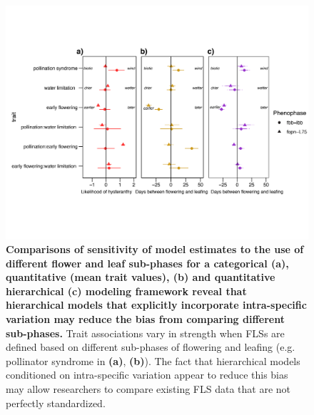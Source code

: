 \documentclass[11pt]{article}
\begin{document}
  \begin{figure}[H]
  \centering
  \includegraphics[width=\textwidth]{..//..//HFmodelplots4SUPP-01.png} 
  \caption{\textbf{Comparisons of sensitivity of model estimates to the use of different flower and leaf sub-phases for a categorical  \textbf{(a)}, quantitative (mean trait values), \textbf{(b)} and quantitative hierarchical \textbf{(c)} modeling framework reveal that hierarchical models that explicitly incorporate intra-specific variation may reduce the bias from comparing different sub-phases.} Trait associations vary in strength when FLSs are defined based on different sub-phases of flowering and leafing (e.g. pollinator syndrome in \textbf{(a)}, \textbf{(b)}). The fact that hierarchical models conditioned on intra-specific variation appear to reduce this bias may allow researchers to compare existing FLS data that are not perfectly standardized.}
  \label{fig:sensitivity}
  \end{figure}
  
\end{document}
